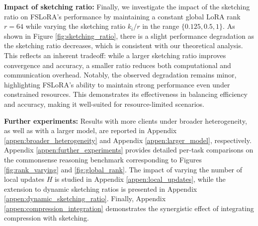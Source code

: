 \documentclass{article} %
\theoremstyle{plain}
\theoremstyle{definition}
\begin{document}
\textbf{Impact of sketching ratio:} Finally, we investigate the impact of the sketching ratio on FSLoRA's performance by maintaining a constant global LoRA rank $r=64$ while varying the sketching ratio \(k_i/r\) in the range \(\{0.125, 0.5, 1\}\). 
As shown in Figure \ref{fig:sketching_ratio}, there is a slight performance degradation as the sketching ratio decreases, which is consistent with our theoretical analysis. This reflects an inherent tradeoff: while a larger sketching ratio improves convergence and accuracy, a smaller ratio reduces both computational and communication overhead. Notably, the observed degradation remains minor, highlighting FSLoRA's ability to maintain strong performance even under constrained resources. This demonstrates its effectiveness in balancing efficiency and accuracy, making it well-suited for resource-limited scenarios.


\textbf{Further experiments:} 
Results with more clients under broader heterogeneity, as well as with a larger model, are reported in Appendix \ref{appen:broader_heterogeneity} and Appendix \ref{appen:larger_model}, respectively. Appendix \ref{appen:further_experiments} provides detailed per-task comparisons on the commonsense reasoning benchmark corresponding to Figures \ref{fig:rank_varying} and \ref{fig:global_rank}. The impact of varying the number of local updates $H$ is studied in Appendix \ref{appen:local_updates}, while the extension to dynamic sketching ratios is presented in Appendix \ref{appen:dynamic_sketching_ratio}. Finally, Appendix \ref{appen:compression_integration} demonstrates the synergistic effect of integrating compression with sketching.


\end{document}
